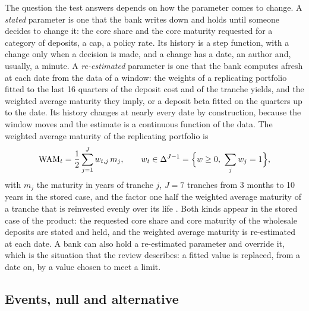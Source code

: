 The question the test answers depends on how the parameter comes to change. A \emph{stated} parameter is one that the bank writes down and holds until someone decides to change it: the core share and the core maturity requested for a category of deposits, a cap, a policy rate. Its history is a step function, with a change only when a decision is made, and a change has a date, an author and, usually, a minute. A \emph{re-estimated} parameter is one that the bank computes afresh at each date from the data of a window: the weights of a replicating portfolio fitted to the last 16 quarters of the deposit cost and of the tranche yields, and the weighted average maturity they imply, or a deposit beta fitted on the quarters up to the date. Its history changes at nearly every date by construction, because the window moves and the estimate is a continuous function of the data. The weighted average maturity of the replicating portfolio is
\begin{equation}
\mathrm{WAM}_t=\frac12\sum_{j=1}^{J} w_{t,j}\,m_j,\qquad w_{t}\in\Delta^{J-1}=\Bigl\{w\ge 0,\ \sum_j w_j=1\Bigr\},
\label{eq:wam}
\end{equation}
with $m_j$ the maturity in years of tranche $j$, $J=7$ tranches from 3 months to 10 years in the stored case, and the factor one half the weighted average maturity of a tranche that is reinvested evenly over its life \citep[Annex~1]{bcbs2016}. Both kinds appear in the stored case of the product: the requested core share and core maturity of the wholesale deposits are stated and held, and the weighted average maturity is re-estimated at each date. A bank can also hold a re-estimated parameter and override it, which is the situation that the review describes: a fitted value is replaced, from a date on, by a value chosen to meet a limit.

\subsection{Events, null and alternative}
\label{sec:problem-events}

